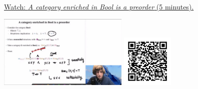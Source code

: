 
\begin{minipage}{10cm}
    \href{https://act4e-spring21.netlify.app/videos/spring2021-enrichment:bool-enriched.html}{Watch: \emph{A category enriched in Bool is a preorder} (5 minutes).}
        
    \href{https://act4e-spring21.netlify.app/videos/spring2021-enrichment:bool-enriched.html}{\includegraphics[height=3.5cm]{spring2021-enrichment:bool-enriched/thumbnails.jpg}}
    \href{https://act4e-spring21.netlify.app/videos/spring2021-enrichment:bool-enriched.html}{\includegraphics[height=2.5cm]{spring2021-enrichment:bool-enriched/qrcode.png}}
\end{minipage}
